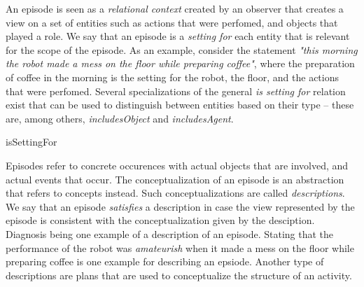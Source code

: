 An episode is seen as a \emph{relational context} created by an observer that creates a view on a set of entities such as actions that were perfomed, and objects that played a role. We say that an episode is a \emph{setting for} each entity that is relevant for the scope of the episode. As an example, consider the statement \emph{"this morning the robot made a mess on the floor while preparing coffee"}, where the preparation of coffee in the morning is the setting for the robot, the floor, and the actions that were perfomed.
Several specializations of the general \emph{is setting for} relation exist that can be used to distinguish between entities based on their type -- these are, among others, \emph{includesObject} and \emph{includesAgent}.

\begin{ODP}{isSettingFor}
\end{ODP}

Episodes refer to concrete occurences with actual objects that are involved, and actual events that occur.
The conceptualization of an episode is an abstraction that refers to concepts instead.
Such conceptualizations are called \emph{descriptions}.
We say that an episode \emph{satisfies} a description in case the view represented
by the episode is consistent with the conceptualization given by the desciption.
Diagnosis being one example of a description of an episode.
Stating that the performance of the robot was \emph{amateurish} when it made a mess on the floor while
preparing coffee is one example for describing an epsiode.
Another type of descriptions are plans that are used to conceptualize the structure of an activity.

